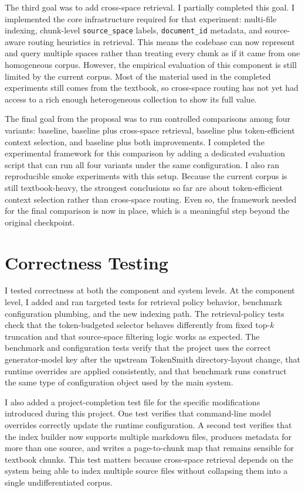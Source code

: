 \documentclass[10pt,twocolumn]{article}
\begin{document}
The third goal was to add cross-space retrieval. I partially completed this goal. I implemented the core infrastructure required for that experiment: multi-file indexing, chunk-level \texttt{source\_space} labels, \texttt{document\_id} metadata, and source-aware routing heuristics in retrieval. This means the codebase can now represent and query multiple spaces rather than treating every chunk as if it came from one homogeneous corpus. However, the empirical evaluation of this component is still limited by the current corpus. Most of the material used in the completed experiments still comes from the textbook, so cross-space routing has not yet had access to a rich enough heterogeneous collection to show its full value.

The final goal from the proposal was to run controlled comparisons among four variants: baseline, baseline plus cross-space retrieval, baseline plus token-efficient context selection, and baseline plus both improvements. I completed the experimental framework for this comparison by adding a dedicated evaluation script that can run all four variants under the same configuration. I also ran reproducible smoke experiments with this setup. Because the current corpus is still textbook-heavy, the strongest conclusions so far are about token-efficient context selection rather than cross-space routing. Even so, the framework needed for the final comparison is now in place, which is a meaningful step beyond the original checkpoint.

\section*{Correctness Testing}
I tested correctness at both the component and system levels. At the component level, I added and ran targeted tests for retrieval policy behavior, benchmark configuration plumbing, and the new indexing path. The retrieval-policy tests check that the token-budgeted selector behaves differently from fixed top-$k$ truncation and that source-space filtering logic works as expected. The benchmark and configuration tests verify that the project uses the correct generator-model key after the upstream TokenSmith directory-layout change, that runtime overrides are applied consistently, and that benchmark runs construct the same type of configuration object used by the main system.

I also added a project-completion test file for the specific modifications introduced during this project. One test verifies that command-line model overrides correctly update the runtime configuration. A second test verifies that the index builder now supports multiple markdown files, produces metadata for more than one source, and writes a page-to-chunk map that remains sensible for textbook chunks. This test matters because cross-space retrieval depends on the system being able to index multiple source files without collapsing them into a single undifferentiated corpus.
\end{document}
